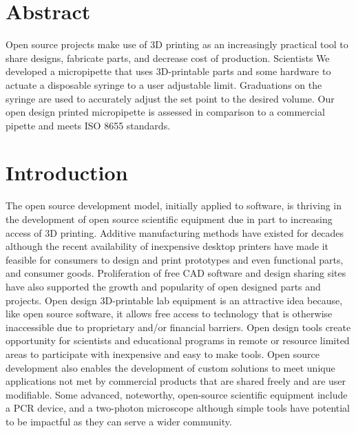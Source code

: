 \documentclass[10pt,letterpaper]{article}
\begin{document}
\section*{Abstract}
Open source projects make use of 3D printing as an increasingly practical tool to share designs, fabricate parts, and decrease cost of production.
Scientists
We developed a micropipette that uses 3D-printable parts and some hardware to actuate a disposable syringe to a user adjustable limit.
Graduations on the syringe are used to accurately adjust the set point to the desired volume.  
Our open design printed micropipette is assessed in comparison to a commercial pipette and meets ISO 8655 standards.

\linenumbers

\section*{Introduction}
The open source development model, initially applied to software, is thriving in the development of open source scientific equipment due in part to increasing access of 3D printing\cite{Baden2015,Pearce2013}.
Additive manufacturing methods have existed for decades although the recent availability of inexpensive desktop printers\cite{MakerbotIndustries,RepRap} have made it feasible for consumers to design and print prototypes and even functional parts, and consumer goods\cite{Fullerton2014,Wittbrodt2013}.
Proliferation of free CAD software\cite{OpenScad,Blender,SketchUp,123D} and design sharing sites\cite{Thingiverse,NationalInstitutesofHealth,GrabCAD,GitHubInc} have also supported the growth and popularity of open designed parts and projects.
Open design 3D-printable lab equipment is an attractive idea because, like open source software, it allows free access to technology that is otherwise inaccessible due to proprietary and/or financial barriers. 
Open design tools create opportunity for scientists and educational programs in remote or resource limited areas to participate with inexpensive and easy to make tools\cite{Baden2015,Marzullo2012,Lang2011,Baker2014,Cybulski2014}. 
Open source development also enables the development of custom solutions to meet unique applications not met by commercial products that are shared freely and are user modifiable\cite{Fullerton2014,Pearce2012,Rankin2014,Sulkin2013}.
Some advanced, noteworthy, open-source scientific equipment include a PCR device\cite{ChaiBiotechnologiesInc2015}, and a two-photon microscope\cite{Rosenegger2014} although simple tools have potential to be impactful as they can serve a wider community.
\end{document}
